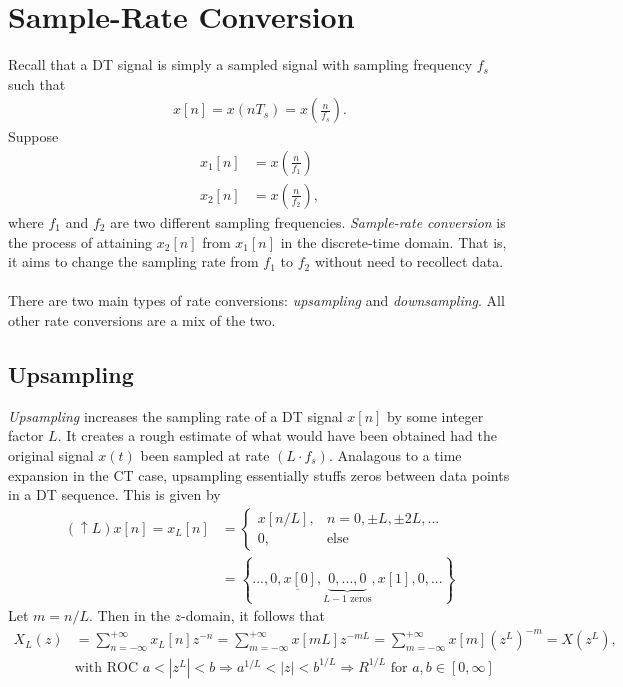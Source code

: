 \documentclass{report}
\begin{document}
\section{Sample-Rate Conversion}
Recall that a DT signal is simply a sampled signal with sampling frequency $f_s$ such that 
\begin{align}
    x[n] = x(nT_s) = x\left(\frac{n}{f_s}\right).
\end{align}
Suppose 
\begin{align}
    x_1[n] &= x\left(\frac{n}{f_1}\right) \\
    x_2[n] &= x\left(\frac{n}{f_2}\right),
\end{align}
where $f_1$ and $f_2$ are two different sampling frequencies. \emph{Sample-rate conversion} is 
the process of attaining $x_2[n]$ from $x_1[n]$ in the discrete-time domain. That is, it aims to 
change the sampling rate from $f_1$ to $f_2$ without need to recollect data.
\\ \\
There are two main types of rate conversions: \emph{upsampling} and \emph{downsampling}. All other rate 
conversions are a mix of the two. 

\subsection{Upsampling}
\emph{Upsampling} increases the sampling rate of a DT signal $x[n]$ by some integer factor $L$. It creates a rough estimate of 
what would have been obtained had the original signal $x(t)$ been sampled at rate $(L\cdot f_s)$. Analagous to 
a time expansion in the CT case, upsampling essentially stuffs zeros between data points in a DT sequence. This is given by 
\begin{align}
    (\uparrow L)x[n] = x_L[n] &=
    \begin{cases}
        x[n/L], & n=0,\pm L,\pm 2L,... \\
        0, & \text{else}
    \end{cases} \\
    &= \left\{...,0,\underbar{x[0]}, \underbrace{0,...,0}_{L-1 \text{ zeros}}, x[1], 0, ...\right\}
\end{align}
Let $m=n/L$. Then in the $z$-domain, it follows that
\begin{align}
    X_L(z) &= \sum_{n=-\infty}^{+\infty} x_L[n]z^{-n} = \sum_{m=-\infty}^{+\infty} x[mL]z^{-mL} = \sum_{m=-\infty}^{+\infty} x[m](z^L)^{-m} = X(z^L), \\
    & \text{with ROC } a<|z^L|<b \Longrightarrow a^{1/L}<|z|<b^{1/L} \Longrightarrow R^{1/L} \text{ for } a,b\in[0,\infty] \nonumber
\end{align}
\end{document}
